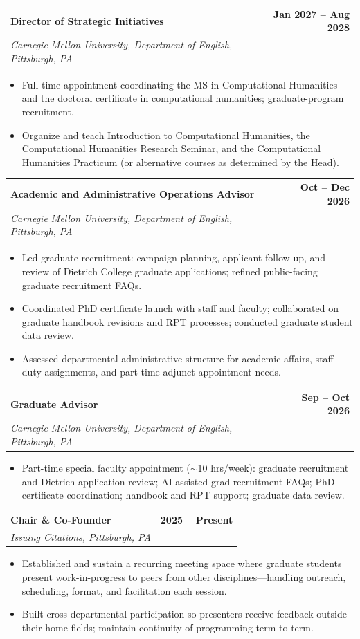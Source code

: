 \documentclass[11pt,letterpaper]{article}
\makeatletter
\newcommand{\entry}[4]{%
  \noindent\begin{tabularx}{\linewidth}{@{}X r@{}}
    \textbf{#1} & \textbf{#4}\\
    \textit{#2, #3} & \\
  \end{tabularx}\vspace{1pt}}
\makeatother
\begin{document}
\entry{Director of Strategic Initiatives}{Carnegie Mellon University, Department of English}{Pittsburgh, PA}{Jan 2027 -- Aug 2028}
\begin{itemize}
  \item Full-time appointment coordinating the MS in Computational Humanities and the doctoral certificate in computational humanities; graduate-program recruitment.
  \item Organize and teach Introduction to Computational Humanities, the Computational Humanities Research Seminar, and the Computational Humanities Practicum (or alternative courses as determined by the Head).
\end{itemize}
\vspace{5pt}

\entry{Academic and Administrative Operations Advisor}{Carnegie Mellon University, Department of English}{Pittsburgh, PA}{Oct -- Dec 2026}
\begin{itemize}
  \item Led graduate recruitment: campaign planning, applicant follow-up, and review of Dietrich College graduate applications; refined public-facing graduate recruitment FAQs.
  \item Coordinated PhD certificate launch with staff and faculty; collaborated on graduate handbook revisions and RPT processes; conducted graduate student data review.
  \item Assessed departmental administrative structure for academic affairs, staff duty assignments, and part-time adjunct appointment needs.
\end{itemize}
\vspace{5pt}

\entry{Graduate Advisor}{Carnegie Mellon University, Department of English}{Pittsburgh, PA}{Sep -- Oct 2026}
\begin{itemize}
  \item Part-time special faculty appointment ($\sim$10 hrs/week): graduate recruitment and Dietrich application review; AI-assisted grad recruitment FAQs; PhD certificate coordination; handbook and RPT support; graduate data review.
\end{itemize}
\vspace{5pt}

\entry{Chair \& Co-Founder}{Issuing Citations}{Pittsburgh, PA}{2025 -- Present}
\begin{itemize}
  \item Established and sustain a recurring meeting space where graduate students present work-in-progress to peers from other disciplines---handling outreach, scheduling, format, and facilitation each session.
  \item Built cross-departmental participation so presenters receive feedback outside their home fields; maintain continuity of programming term to term.
\end{itemize}
\vspace{5pt}
\end{document}
